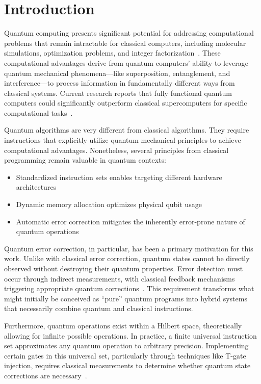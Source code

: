 \section{Introduction}

Quantum computing presents significant potential for addressing computational problems that remain intractable for classical computers, including molecular simulations, optimization problems, and integer factorization~\cite{shor1997,wecker-reactions,cao2018potential,gidney2025factor2048bitrsa}. These computational advantages derive from quantum computers' ability to leverage quantum mechanical phenomena---like superposition, entanglement, and interference---to process information in fundamentally different ways from classical systems. Current research reports that fully functional quantum computers could significantly outperform classical supercomputers for specific computational tasks~\cite{resourceestimation-beverland2022assessing,arute2019quantum,kim2023evidence,morvan2024phase}.

Quantum algorithms are very different from classical algorithms. They require instructions that explicitly utilize quantum mechanical principles to achieve computational advantages. Nonetheless, several principles from classical programming remain valuable in quantum contexts:

\begin{itemize}
\item Standardized instruction sets enables targeting different hardware architectures
\item Dynamic memory allocation optimizes physical qubit usage
\item Automatic error correction mitigates the inherently error-prone nature of quantum operations
\end{itemize}

Quantum error correction, in particular, has been a primary motivation for this work. Unlike with classical error correction, quantum states cannot be directly observed without destroying their quantum properties. Error detection must occur through indirect measurements, with classical feedback mechanisms triggering appropriate quantum corrections~\cite{shor1995scheme}. This requirement transforms what might initially be conceived as ``pure'' quantum programs into hybrid systems that necessarily combine quantum and classical instructions.

Furthermore, quantum operations exist within a Hilbert space, theoretically allowing for infinite possible operations. In practice, a finite universal instruction set approximates any quantum operation to arbitrary precision. Implementing certain gates in this universal set, particularly through techniques like T-gate injection, requires classical measurements to determine whether quantum state corrections are necessary~\cite{bravyi2005universal}.

